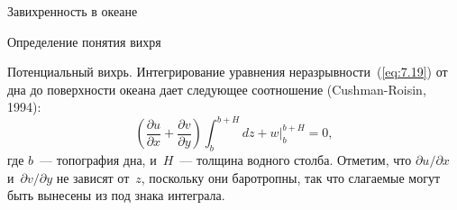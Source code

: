\begin{chapter}{Завихренность в океане}
\begin{section}{Определение понятия вихря}
\begin{paragraph}{Потенциальный вихрь.}
Интегрирование уравнения неразрывности~(\ref{eq:7.19}) от дна до поверхности
океана дает следующее соотношение (Cushman-Roisin, 1994):
\begin{equation}\label{eq:12.6}
 \left( \frac{\partial{u}}{\partial{x}} + \frac{\partial{v}}{\partial{y}}\right) \int_{b}^{b+H} dz + w \bigr|_{b}^{b+H} = 0,
\end{equation}
где $b$~--- топография дна, и~$H$~--- толщина водного столба. Отметим, что
$\partial{u}/\partial{x}$ и~$\partial{v}/\partial{y}$ не зависят от~$z$,
поскольку они баротропны, так что слагаемые могут быть вынесены из под
знака интеграла.
%


\end{paragraph}
\end{section}
\end{chapter}
